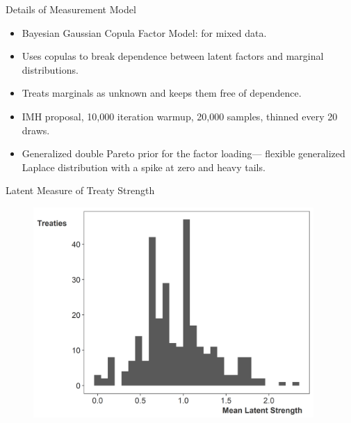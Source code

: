 \documentclass{beamer}
\begin{document}

\begin{frame}{Details of Measurement Model}

\begin{itemize}
\item Bayesian Gaussian Copula Factor Model: for mixed data. 
\item Uses copulas to break dependence between latent factors and marginal distributions. 
\item Treats marginals as unknown and keeps them free of dependence. 
\item IMH proposal, 10,000 iteration warmup, 20,000 samples, thinned every 20 draws. 
\item Generalized double Pareto prior for the factor loading--- flexible generalized Laplace distribution with a spike at zero and heavy tails. 
\end{itemize} 


\end{frame}


\begin{frame}{Latent Measure of Treaty Strength}

\begin{figure}[htbp]
	\centering
		\includegraphics[width=0.95\textwidth]{ls-hist.png}
\end{figure}


\end{frame} 

\end{document}
